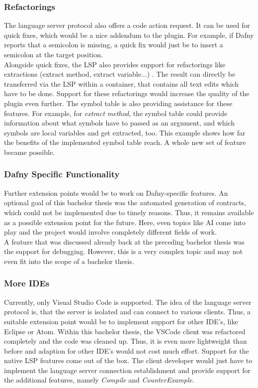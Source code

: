 \subsubsection{Refactorings}
The language server protocol also offers a code action request.
It can be used for quick fixes, which would be a nice addendum to the plugin.
For example, if Dafny reports that a semicolon is missing, a quick fix would just be to insert a semicolon at the target position.\\

Alongside quick fixes, the LSP also provides support for refactorings like extractions (extract method, extract variable...) \cite{lspspec}.
The result can directly be transferred via the LSP within a  container, that contains all text edits which have to be done.
Support for these refactorings would increase the quality of the plugin even further.
The symbol table is also providing assistance for these features.
For example, for \textit{extract method}, the symbol table could provide information about what symbols have to passed as an argument, and which symbols are local variables and get extracted, too.
This example shows how far the benefits of the implemented symbol table reach.
A whole new set of feature became possible.

\subsubsection{Dafny Specific Functionality}
Further extension points would be to work on Dafny-specific features.
An optional goal of this bachelor thesis was the automated generation of contracts, which could not be implemented due to timely reasons.
Thus, it remains available as a possible extension point for the future.
Here, even topics like AI come into play and the project would involve completely different fields of work.\\

A feature that was discussed already back at the preceding bachelor thesis \cite{ba} was the support for debugging.
However, this is a very complex topic and may not even fit into the scope of a bachelor thesis.

\subsubsection{More IDEs}
Currently, only Visual Studio Code is supported.
The idea of the language server protocol is, that the server is isolated and can connect to various clients.
Thus, a suitable extension point would be to implement support for other IDE's, like Eclipse or Atom.
Within this bachelor thesis, the VSCode client was refactored completely and the code was cleaned up.
Thus, it is even more lightweight than before and adaption for other IDE's would not cost much effort.
Support for the native LSP features come out of the box.
The client developer would just have to implement the language server connection establishment and provide support for the additional features, namely \textit{Compile} and \textit{CounterExample}.

